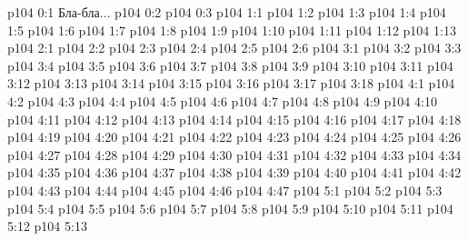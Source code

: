 \author{Мелхиседек}
\vs p104 0:1  Бла-бла...
\vs p104 0:2 
\vs p104 0:3 
\vs p104 1:1 
\vs p104 1:2 
\vs p104 1:3 
\vs p104 1:4 
\vs p104 1:5 \pc 
\vs p104 1:6 
\vs p104 1:7 
\vs p104 1:8 \pc 
\vs p104 1:9 
\vs p104 1:10 \pc 
\vs p104 1:11 
\vs p104 1:12 
\vs p104 1:13 
\vs p104 2:1 
\vs p104 2:2 
\vs p104 2:3 
\vs p104 2:4 
\vs p104 2:5 
\vs p104 2:6 
\vs p104 3:1 
\vs p104 3:2 
\vs p104 3:3 
\vs p104 3:4 
\vs p104 3:5 \pc 
\vs p104 3:6 
\vs p104 3:7 
\vs p104 3:8 
\vs p104 3:9 
\vs p104 3:10 
\vs p104 3:11 
\vs p104 3:12 
\vs p104 3:13 \pc 
\vs p104 3:14 \pc 
\vs p104 3:15 
\vs p104 3:16 
\vs p104 3:17 
\vs p104 3:18 
\vs p104 4:1 
\vs p104 4:2 \pc 
\vs p104 4:3 \pc 
\vs p104 4:4 
\vs p104 4:5 
\vs p104 4:6 
\vs p104 4:7 \pc 
\vs p104 4:8 
\vs p104 4:9 \pc 
\vs p104 4:10 
\vs p104 4:11 
\vs p104 4:12 
\vs p104 4:13 \pc 
\vs p104 4:14 
\vs p104 4:15 
\vs p104 4:16 \pc 
\vs p104 4:17 
\vs p104 4:18 
\vs p104 4:19 
\vs p104 4:20 \pc 
\vs p104 4:21 
\vs p104 4:22 \pc 
\vs p104 4:23 
\vs p104 4:24 
\vs p104 4:25 
\vs p104 4:26 \pc 
\vs p104 4:27 
\vs p104 4:28 
\vs p104 4:29 \pc 
\vs p104 4:30 
\vs p104 4:31 
\vs p104 4:32 
\vs p104 4:33 \pc 
\vs p104 4:34 \pc 
\vs p104 4:35 
\vs p104 4:36 
\vs p104 4:37 
\vs p104 4:38 
\vs p104 4:39 \pc 
\vs p104 4:40 
\vs p104 4:41 
\vs p104 4:42 
\vs p104 4:43 \pc 
\vs p104 4:44 
\vs p104 4:45 \pc 
\vs p104 4:46 
\vs p104 4:47 
\vs p104 5:1 
\vs p104 5:2 
\vs p104 5:3 
\vs p104 5:4 
\vs p104 5:5 
\vs p104 5:6 \pc 
\vs p104 5:7 \pc 
\vs p104 5:8 
\vs p104 5:9 
\vs p104 5:10 
\vs p104 5:11 \pc 
\vs p104 5:12 \pc 
\vsetoff
\vs p104 5:13 
\quizlink
